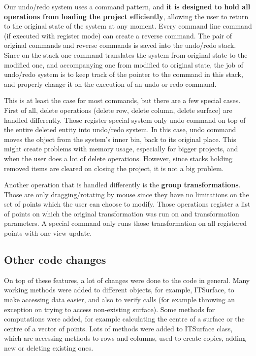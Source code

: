 \documentclass[a4paper, 11pt, article]{report}
\begin{document}
Our undo/redo system uses a command pattern, and \textbf{it is designed to hold all operations from loading the project efficiently}, allowing the user to return to the original state of the system at any moment. Every command line command (if executed with register mode) can create a reverse command. The pair of original commands and reverse commands is saved into the undo/redo stack. Since on the stack one command translates the system from original state to the modified one, and accompanying one from modified to original state, the job of undo/redo system is to keep track of the pointer to the command in this stack, and properly change it on the execution of an undo or redo command. 

This is at least the case for most commands, but there are a few special cases. First of all, delete operations (delete row, delete column, delete surface) are handled differently. Those register special system only undo command on top of the entire deleted entity into undo/redo system. In this case, undo command moves the object from the system's inner bin, back to its original place. This might create problems with memory usage, especially for bigger projects, and when the user does a lot of delete operations. However, since stacks holding removed items are cleared on closing the project, it is not a big problem. 

Another operation that is handled differently is the \textbf{group transformations}. Those are only dragging/rotating by mouse since they have no limitations on the set of points which the user can choose to modify. Those operations register a list of points on which the original transformation was run on and transformation parameters. A special command only runs those transformation on all registered points with one view update.

\subsection{Other code changes}

On top of these features, a lot of changes were done to the code in general. Many working methods were added to different objects, for example, ITSurface, to make accessing data easier, and also to verify calls (for example throwing an exception on trying to access non-existing surface). Some methods for computations were added, for example calculating the centre of a surface or the centre of a vector of points. Lots of methods were added to ITSurface class, which are accessing methods to rows and columns, used to create copies, adding new or deleting existing ones. 
\end{document}
